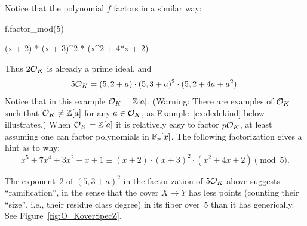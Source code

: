 \noindent
Notice that the polynomial $f$ factors in a similar way:

\begin{sagecode} %
\begin{sagecell}
f.factor_mod(5)
\end{sagecell}
\begin{sageout}
(x + 2) * (x + 3)^2 * (x^2 + 4*x + 2)
\end{sageout}
\end{sagecode}
Thus $2\mathcal{O}_K$ is already a prime ideal, and
$$
  5\mathcal{O}_K = (5,2+a)\cdot(5,3+a)^2\cdot(5,2+4a+a^2).
$$
Notice that in this example $\mathcal{O}_K=\mathbb{Z}[a]$. (Warning: There are examples of
$\mathcal{O}_K$ such that $\mathcal{O}_K\neq \mathbb{Z}[a]$ for any $a\in\mathcal{O}_K$, as
Example~\ref{ex:dedekind} below illustrates.) When $\mathcal{O}_K=\mathbb{Z}[a]$ it is
relatively easy to factor $p\mathcal{O}_K$, at least assuming one can factor
polynomials in $\mathbb{F}_p[x]$.
The following factorization gives a hint as to why:
$$
  x^5+7x^4+3x^2-x+1 \equiv (x+2) \cdot (x+3)^2 \cdot (x^2+4x+2)\pmod{5}.
$$

The exponent~$2$ of $(5,3+a)^2$ in the factorization of $5\mathcal{O}_K$ above
suggests ``ramification'', in the sense that the cover $X \rightarrow Y$ has
less points (counting their ``size'', i.e., their residue class degree)
in its fiber over~$5$ than it has generically.
See Figure~\ref{fig:O_KoverSpecZ}.

